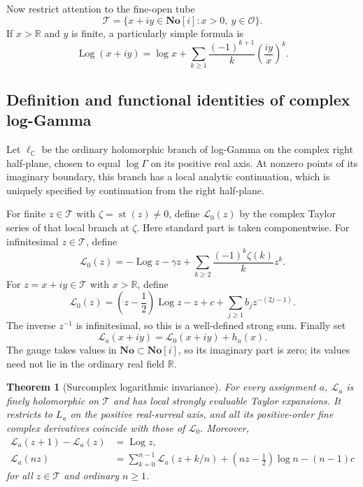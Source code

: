 \documentclass[11pt,letterpaper]{article}
\numberwithin{equation}{section}
\newtheorem{theorem}{Theorem}[section]
\theoremstyle{plain}
\theoremstyle{definition}
\theoremstyle{remark}
\newcommand{\No}{\mathbf{No}}
\newcommand{\SC}{\mathbf{No}[i]}
\newcommand{\R}{\mathbb R}
\newcommand{\C}{\mathbb C}
\newcommand{\Ocal}{\mathcal O}
\newcommand{\st}{\operatorname{st}}
\newcommand{\Log}{\operatorname{Log}}
\newcommand{\tube}{\mathcal T}
\newcommand{\Lt}{\mathcal L}
\begin{document}
Now restrict attention to the fine-open tube
\[
 \tube=\{x+iy\in\SC:x>0,\ y\in\Ocal\}.
\]
If $x>\R$ and $y$ is finite, a particularly simple formula is
\begin{equation}\label{eq:log-infinite-complex}
 \Log(x+iy)=\log x+\sum_{k\ge1}
 \frac{(-1)^{k+1}}k\left(\frac{iy}{x}\right)^k.
\end{equation}

\subsection{Definition and functional identities of complex log-Gamma}
Let $\ell_{\C}$ be the ordinary holomorphic branch of log-Gamma on the
complex right half-plane, chosen to equal $\log\Gamma$ on its positive
real axis. At nonzero points of its imaginary boundary, this branch has a
local analytic continuation, which is uniquely specified by continuation
from the right half-plane.

For finite $z\in\tube$ with $\zeta=\st(z)\ne0$, define
$\Lt_0(z)$ by the complex Taylor series of that local branch at $\zeta$.
Here standard part is taken componentwise. For infinitesimal $z\in\tube$,
define
\begin{equation}\label{eq:complex-small}
 \Lt_0(z)=-\Log z-\gamma z+
 \sum_{k\ge2}\frac{(-1)^k\zeta(k)}k z^k.
\end{equation}
For $z=x+iy\in\tube$ with $x>\R$, define
\begin{equation}\label{eq:complex-infinite}
 \Lt_0(z)=\left(z-\frac12\right)\Log z-z+c+
 \sum_{j\ge1}b_jz^{-(2j-1)}.
\end{equation}
The inverse $z^{-1}$ is infinitesimal, so this is a well-defined strong sum.
Finally set
\begin{equation}\label{eq:complex-gauge}
 \Lt_a(x+iy)=\Lt_0(x+iy)+h_a(x).
\end{equation}
The gauge takes values in $\No\subset\SC$, so its imaginary part is zero;
its values need not lie in the ordinary real field $\R$.

\begin{theorem}[Surcomplex logarithmic invariance]\label{thm:complex-log}
For every assignment $a$, $\Lt_a$ is finely holomorphic on $\tube$ and
has local strongly evaluable Taylor expansions. It restricts to $L_a$ on
the positive real-surreal axis, and all its positive-order fine complex
derivatives coincide with those of $\Lt_0$. Moreover,
\begin{align}
 \Lt_a(z+1)-\Lt_a(z)&=\Log z,\label{eq:complex-recurrence}\\
 \Lt_a(nz)&=\sum_{k=0}^{n-1}\Lt_a(z+k/n)
 +(nz-\tfrac12)\log n-(n-1)c\label{eq:complex-gauss}
\end{align}
for all $z\in\tube$ and ordinary $n\ge1$.
\end{theorem}
\end{document}
